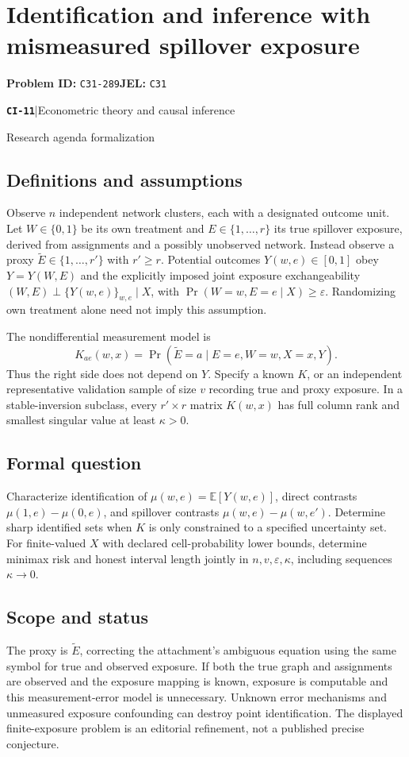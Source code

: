 \documentclass[11pt,a4paper]{article}
\newcommand{\E}{\mathbb E}
\newcommand{\entrymeta}[3]{{\sffamily\small\color{muted}\textbf{\texttt{#1}}\quad|\quad #2\par #3\par}}
\begin{document}
\section*{Identification and inference with mismeasured spillover exposure}
\textbf{Problem ID:} \texttt{C31-289}\quad \textbf{JEL:} \texttt{C31}\par
\label{problem:OP-0490}
\label{beyond:CI-11}
\entrymeta{CI-11}{Econometric theory and causal inference}{Research agenda formalization}
\subsection*{Definitions and assumptions}
Observe $n$ independent network clusters, each with a designated outcome unit. Let $W\in\{0,1\}$ be its own treatment and $E\in\{1,\ldots,r\}$ its true spillover exposure, derived from assignments and a possibly unobserved network. Instead observe a proxy $\widetilde E\in\{1,\ldots,r'\}$ with $r'\geq r$. Potential outcomes $Y(w,e)\in[0,1]$ obey $Y=Y(W,E)$ and the explicitly imposed joint exposure exchangeability
$(W,E)\perp\{Y(w,e)\}_{w,e}\mid X$, with $\Pr(W=w,E=e\mid X)\geq\varepsilon$.
Randomizing own treatment alone need not imply this assumption.

The nondifferential measurement model is
\[
K_{ae}(w,x)=\Pr(\widetilde E=a\mid E=e,W=w,X=x,Y).
\]
Thus the right side does not depend on $Y$. Specify a known $K$, or an independent representative validation sample of size $v$ recording true and proxy exposure. In a stable-inversion subclass, every $r'\times r$ matrix $K(w,x)$ has full column rank and smallest singular value at least $\kappa>0$.
\subsection*{Formal question}
Characterize identification of $\mu(w,e)=\E[Y(w,e)]$, direct contrasts $\mu(1,e)-\mu(0,e)$, and spillover contrasts $\mu(w,e)-\mu(w,e')$. Determine sharp identified sets when $K$ is only constrained to a specified uncertainty set. For finite-valued $X$ with declared cell-probability lower bounds, determine minimax risk and honest interval length jointly in $n,v,\varepsilon,\kappa$, including sequences $\kappa\to0$.
\subsection*{Scope and status}
The proxy is $\widetilde E$, correcting the attachment's ambiguous equation using the same symbol for true and observed exposure. If both the true graph and assignments are observed and the exposure mapping is known, exposure is computable and this measurement-error model is unnecessary. Unknown error mechanisms and unmeasured exposure confounding can destroy point identification. The displayed finite-exposure problem is an editorial refinement, not a published precise conjecture.
\end{document}

